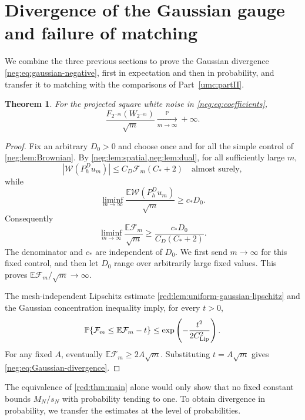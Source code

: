 \documentclass[11pt]{article}
\newtheorem{theorem}{Theorem}[section]
\theoremstyle{definition}
\theoremstyle{remark}
\numberwithin{equation}{section}
\begin{document}
\section{Divergence of the Gaussian gauge and failure of matching}
\label{neg:sec:conclusion}

We combine the three previous sections to prove the Gaussian
divergence \eqref{neg:eq:gaussian-negative}, first in expectation and
then in probability, and transfer it to matching with the comparisons
of Part~\ref{umc:partII}.

\begin{theorem}
\label{neg:thm:Gaussian}
For the projected \emph{square} white noise in
\eqref{neg:eq:coefficients},
\begin{equation}\label{neg:eq:Gaussian-divergence}
 \frac{F_{2^{-m}}(W_{2^{-m}})}{\sqrt m}
  \xrightarrow[m\to\infty]{\mathbb P}+\infty.
\end{equation}
\end{theorem}
\begin{proof}
Fix an arbitrary $D_0>0$ and choose once and for all the
simple control of \cref{neg:lem:Brownian}. By
\cref{neg:lem:spatial,neg:lem:dual}, for all sufficiently large $m$,
\[
 |\mathcal W(P_h^Du_m)|\le
 C_D\mathcal F_m(C_*+2)
 \quad\text{almost surely},
\]
while
\[
 \liminf_{m\to\infty}
      \frac{\mathbb E\mathcal W(P_h^Du_m)}{\sqrt m}
 \ge c_* D_0.
\]
Consequently
\begin{equation}\label{neg:eq:expectation-divergence}
 \liminf_{m\to\infty}\frac{\mathbb E\mathcal F_m}{\sqrt m}
 \ge\frac{c_*D_0}{C_D(C_*+2)}.
\end{equation}
The denominator and $c_*$ are independent of $D_0$. We first send
$m\to\infty$ for this fixed control, and then let $D_0$ range over
arbitrarily large fixed values. This proves
$\mathbb E\mathcal F_m/\sqrt m\to\infty$.

The mesh-independent Lipschitz estimate
\cref{red:lem:uniform-gaussian-lipschitz} and the Gaussian
concentration inequality imply, for every $t>0$,
\[
 \mathbb P\{\mathcal F_m\le\mathbb E\mathcal F_m-t\}
       \le\exp\left(-\frac{t^2}{2C_{\rm Lip}^2}\right).
\]
For any fixed $A$, eventually $\mathbb E\mathcal F_m\ge2A\sqrt m$.
Substituting $t=A\sqrt m$ gives
\eqref{neg:eq:Gaussian-divergence}.
\end{proof}

The equivalence of \cref{red:thm:main} alone would only show that no
fixed constant bounds $M_N/s_N$ with probability tending to one. To
obtain divergence in probability, we transfer the estimates at the
level of probabilities.
\end{document}
